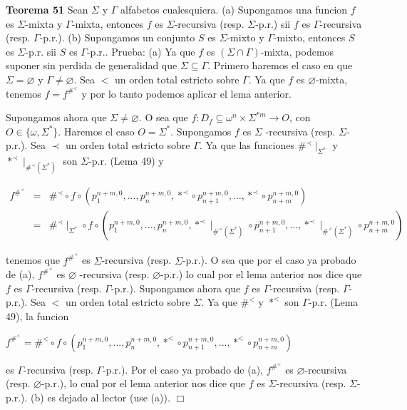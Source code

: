 \textbf{Teorema 51} Sean \(\Sigma \) y \(\Gamma \) alfabetos cualesquiera.
(a) Supongamos una funcion \(f\) es \(\Sigma \)-mixta y \(\Gamma \)-mixta, entonces \(f\) es \(\Sigma \)-recursiva (resp. \(\Sigma \)-p.r.) sii \(f\) es \( \Gamma \)-recursiva (resp. \(\Gamma \)-p.r.).
(b) Supongamos un conjunto \(S\) es \(\Sigma \)-mixto y \(\Gamma \)-mixto, entonces \(S\) es \(\Sigma \)-p.r. sii \(S\) es \(\Gamma \)-p.r..
Prueba: (a) Ya que \(f\) es \((\Sigma \cap \Gamma )\)-mixta, podemos suponer sin perdida de generalidad que \(\Sigma \subseteq \Gamma \). Primero haremos el caso en que \(\Sigma =\varnothing \) y \(\Gamma \neq \varnothing \). Sea \(< \) un orden total estricto sobre \(\Gamma \). Ya que \(f\) es \(\varnothing \)-mixta, tenemos \( f=f^{\#^{< }}\) y por lo tanto podemos aplicar el lema anterior.

Supongamos ahora que \(\Sigma \neq \varnothing \). O sea que \(f:D_{f}\subseteq \omega ^{n}\times \Sigma ^{\ast m}\rightarrow O\), con \(O\in \{\omega ,\Sigma ^{\ast }\}.\) Haremos el caso \(O=\Sigma ^{\ast }.\) Supongamos \(f\) es \(\Sigma \) -recursiva (resp. \(\Sigma \)-p.r.). Sea \(\prec \) un orden total estricto sobre \(\Gamma .\) Ya que las funciones \(\#^{\prec }\mid _{\Sigma ^{\ast }}\) y \(\ast ^{\prec }\mid _{\#^{\prec }(\Sigma ^{\ast })}\) son \(\Sigma \)-p.r. (Lema 49) y

\(\displaystyle \begin{array}{rcl} f^{\#^{\prec }} & =& \#^{\prec }\circ f\circ \left( p_{1}^{n+m,0},...,p_{n}^{n+m,0},\ast ^{\prec }\circ p_{n+1}^{n+m,0},...,\ast ^{\prec }\circ p_{n+m}^{n+m,0}\right) \\ & =& \#^{\prec }\mid _{\Sigma ^{\ast }}\circ f\circ \left( p_{1}^{n+m,0},...,p_{n}^{n+m,0},\ast ^{\prec }\mid _{\#^{\prec }(\Sigma ^{\ast })}\circ p_{n+1}^{n+m,0},...,\ast ^{\prec }\mid _{\#^{\prec }(\Sigma ^{\ast })}\circ p_{n+m}^{n+m,0}\right) \end{array} \)

tenemos que \(f^{\#^{\prec }}\) es \(\Sigma \)-recursiva (resp. \(\Sigma \)-p.r.). O sea que por el caso ya probado de (a), \(f^{\#^{\prec }}\) es \(\varnothing \) -recursiva (resp. \(\varnothing \)-p.r.) lo cual por el lema anterior nos dice que \(f\) es \(\Gamma \)-recursiva (resp. \(\Gamma \)-p.r.).
Supongamos ahora que \(f\) es \(\Gamma \)-recursiva (resp. \(\Gamma \)-p.r.). Sea \( < \) un orden total estricto sobre \(\Sigma .\) Ya que \(\#^{< }\) y \(\ast ^{< }\) son \(\Gamma \)-p.r. (Lema 49), la funcion

\(\displaystyle f^{\#^{< }}=\#^{< }\circ f\circ \left( p_{1}^{n+m,0},...,p_{n}^{n+m,0},\ast ^{< }\circ p_{n+1}^{n+m,0},...,\ast ^{< }\circ p_{n+m}^{n+m,0}\right) \)

es \(\Gamma \)-recursiva (resp. \(\Gamma \)-p.r.). Por el caso ya probado de (a), \(f^{\#^{< }}\) es \(\varnothing \)-recursiva (resp. \(\varnothing \)-p.r.), lo cual por el lema anterior nos dice que \(f\) es \(\Sigma \)-recursiva (resp. \( \Sigma \)-p.r.).
(b) es dejado al lector (use (a)). \(\Box\)
